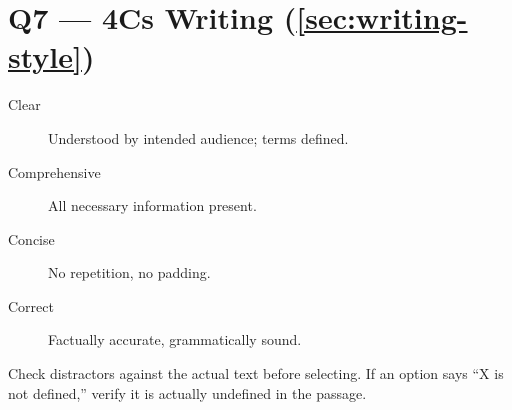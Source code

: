 \documentclass[../main.tex]{subfiles}
\begin{document}
\section*{Q7 — 4Cs Writing (\autoref{sec:writing-style})}

\begin{description}
  \item[Clear] Understood by intended audience; terms defined.
  \item[Comprehensive] All necessary information present.
  \item[Concise] No repetition, no padding.
  \item[Correct] Factually accurate, grammatically sound.
\end{description}

Check distractors against the actual text before selecting. If an option says ``X is not defined,'' verify it is actually undefined in the passage.
\end{document}
